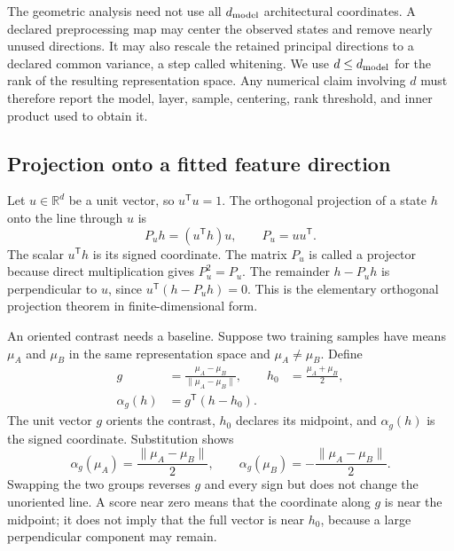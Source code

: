 \documentclass[
  aps,
  reprint,
  superscriptaddress,
  floatfix,
  nofootinbib,
  longbibliography
]{revtex4-2}
\newcommand{\R}{\mathbb{R}}
\newcommand{\T}{^{\mathsf T}}
\newcommand{\norm}[1]{\lVert #1\rVert}
\begin{document}
The geometric analysis need not use all $d_{\rm model}$ architectural
coordinates.  A declared preprocessing map may center the observed states and
remove nearly unused directions.  It may also rescale the retained principal
directions to a declared common variance, a step called whitening.  We use
$d\leq d_{\rm model}$ for the rank of the resulting representation space.
Any numerical claim involving $d$ must therefore report the model,
layer, sample, centering, rank threshold, and inner product used to obtain it.

\subsection{Projection onto a fitted feature direction}

Let $u\in\R^d$ be a unit vector, so $u\T u=1$.  The orthogonal projection of a
state $h$ onto the line through $u$ is
\begin{equation}
 P_u h=(u\T h)u,
 \qquad P_u=uu\T .
 \label{eq:projection-app}
\end{equation}
The scalar $u\T h$ is its signed coordinate.  The matrix $P_u$ is called a
projector because direct multiplication gives $P_u^2=P_u$.  The remainder
$h-P_u h$ is perpendicular to $u$, since
$u\T(h-P_u h)=0$.  This is the elementary orthogonal projection theorem in
finite-dimensional form.

An oriented contrast needs a baseline.  Suppose two training samples have
means $\mu_A$ and $\mu_B$ in the same representation space and
$\mu_A\ne\mu_B$.  Define
\begin{equation}
\begin{aligned}
 g&=\frac{\mu_A-\mu_B}{\norm{\mu_A-\mu_B}},
 &h_0&=\frac{\mu_A+\mu_B}{2},\\
 \alpha_g(h)&=g\T(h-h_0).
\end{aligned}
 \label{eq:signed-axis-app}
\end{equation}
The unit vector $g$ orients the contrast, $h_0$ declares its midpoint, and
$\alpha_g(h)$ is the signed coordinate.  Substitution shows
\begin{equation}
 \alpha_g(\mu_A)=\frac{\norm{\mu_A-\mu_B}}{2},
 \qquad
 \alpha_g(\mu_B)=-\frac{\norm{\mu_A-\mu_B}}{2}.
 \label{eq:mean-scores-app}
\end{equation}
Swapping the two groups reverses $g$ and every sign but does not change the
unoriented line.  A score near zero means that the coordinate along $g$ is near
the midpoint; it does not imply that the full vector is near $h_0$, because a
large perpendicular component may remain.
\end{document}
